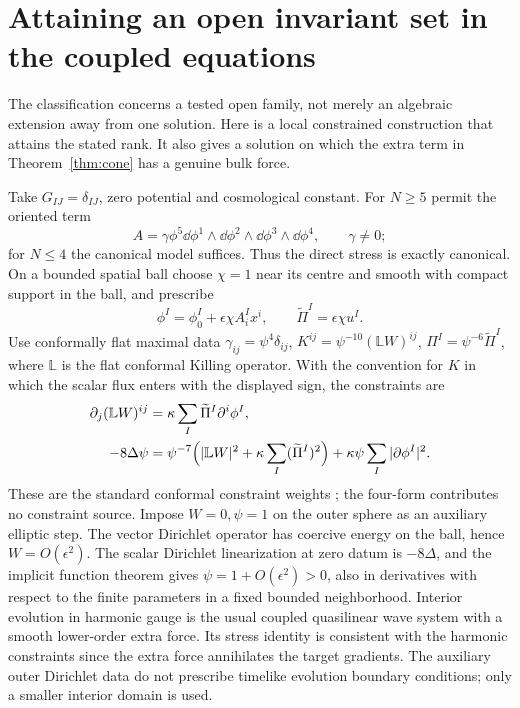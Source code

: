\section{Attaining an open invariant set in the coupled equations}\label{sec:attain}
The classification concerns a tested open family, not merely an algebraic extension away from one solution. Here is a local constrained construction that attains the stated rank. It also gives a solution on which the extra term in Theorem~\ref{thm:cone} has a genuine bulk force.

Take \(G_{IJ}=\delta_{IJ}\), zero potential and cosmological constant. For \(N\ge5\) permit the oriented term
\begin{equation}\label{eq:attainA}
 A=\gamma\phi^5\dd\phi^1\wedge\dd\phi^2\wedge\dd\phi^3\wedge\dd\phi^4,
 \qquad \gamma\ne0 ;
\end{equation}
for \(N\le4\) the canonical model suffices. Thus the direct stress is exactly canonical. On a bounded spatial ball choose \(\chi=1\) near its centre and smooth with compact support in the ball, and prescribe
\[
 \phi^I=\phi_0^I+\epsilon\chi A_i^I x^i,\qquad
 \widetilde\Pi^I=\epsilon\chi u^I .
\]
Use conformally flat maximal data
\(\gamma_{ij}=\psi^4\delta_{ij}\),
\(K^{ij}=\psi^{-10}(\mathbb LW)^{ij}\),
\(\Pi^I=\psi^{-6}\widetilde\Pi^I\), where \(\mathbb L\) is the flat conformal Killing operator. With the convention for \(K\) in which the scalar flux enters with the displayed sign, the constraints are
\begin{align*}
 \partial_j(\mathbb LW)^{ij}
   &=\kappa\sum_I\widetilde\Pi^I\partial^i\phi^I,\\
 -8\Delta\psi
   &=\psi^{-7}\Bigl(|\mathbb LW|^2+\kappa\sum_I(\widetilde\Pi^I)^2\Bigr)
       +\kappa\psi\sum_I|\partial\phi^I|^2 .
\end{align*}
These are the standard conformal constraint weights \cite{CBIP}; the four-form contributes no constraint source. Impose \(W=0,\psi=1\) on the outer sphere as an auxiliary elliptic step. The vector Dirichlet operator has coercive energy on the ball, hence \(W=O(\epsilon^2)\). The scalar Dirichlet linearization at zero datum is \(-8\Delta\), and the implicit function theorem gives \(\psi=1+O(\epsilon^2)>0\), also in derivatives with respect to the finite parameters in a fixed bounded neighborhood. Interior evolution in harmonic gauge is the usual coupled quasilinear wave system with a smooth lower-order extra force. Its stress identity is consistent with the harmonic constraints since the extra force annihilates the target gradients. The auxiliary outer Dirichlet data do not prescribe timelike evolution boundary conditions; only a smaller interior domain is used.

